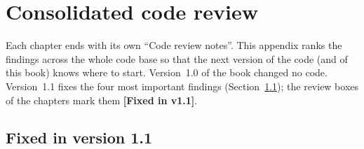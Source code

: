 \chapter{Consolidated code review}\label{app:review}
\sloppy

Each chapter ends with its own ``Code review notes''. This appendix ranks the findings across the whole
code base so that the next version of the code (and of this book) knows where to start. Version~1.0 of the book
changed no code. Version~1.1 fixes the four most important findings (Section~\ref{sec:fixed}); the review boxes of
the chapters mark them \textcolor{OliveGreen}{\textbf{[Fixed in v1.1]}}.

\section{Fixed in version 1.1}\label{sec:fixed}

